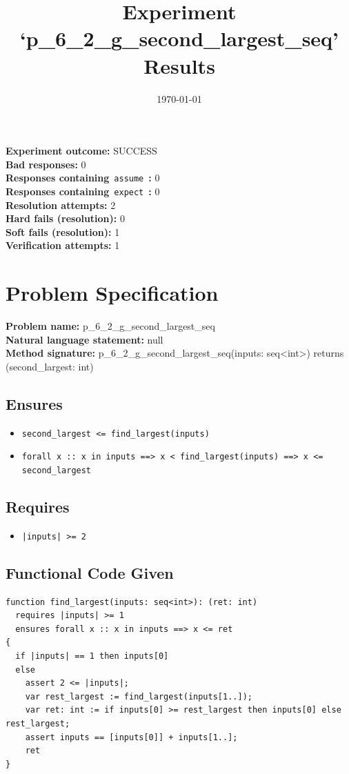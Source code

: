 \documentclass{article}
\begin{document}
\title{Experiment `p\_6\_2\_g\_second\_largest\_seq' Results}
\author{\today}
\date{}
\maketitle
\textbf{Experiment outcome: }SUCCESS
\\\textbf{Bad responses: }0
\\\textbf{Responses containing}~\texttt{assume}~\textbf{: }0
\\\textbf{Responses containing}~\texttt{expect}~\textbf{: }0
\\\textbf{Resolution attempts: }2
\\\textbf{Hard fails (resolution): }0
\\\textbf{Soft fails (resolution): }1
\\\textbf{Verification attempts: }1
\section*{Problem Specification}
\textbf{Problem name: }p\_6\_2\_g\_second\_largest\_seq
\\\textbf{Natural language statement: }null
\\\textbf{Method signature: }p\_6\_2\_g\_second\_largest\_seq(inputs: seq<int>) returns (second\_largest: int)
\subsection*{Ensures}
\begin{itemize}
\item \texttt{second\_largest <= find\_largest(inputs)}
\item \texttt{forall x :: x in inputs ==> x < find\_largest(inputs) ==> x <= second\_largest}
\end{itemize}
\subsection*{Requires}
\begin{itemize}
\item \texttt{|inputs| >= 2}
\end{itemize}
\subsection*{Functional Code Given}
\begin{lstlisting}
function find_largest(inputs: seq<int>): (ret: int)
  requires |inputs| >= 1
  ensures forall x :: x in inputs ==> x <= ret
{
  if |inputs| == 1 then inputs[0]
  else 
    assert 2 <= |inputs|;
    var rest_largest := find_largest(inputs[1..]);
    var ret: int := if inputs[0] >= rest_largest then inputs[0] else rest_largest;
    assert inputs == [inputs[0]] + inputs[1..]; 
    ret 
} 
\end{lstlisting}
\clearpage
\end{document}
